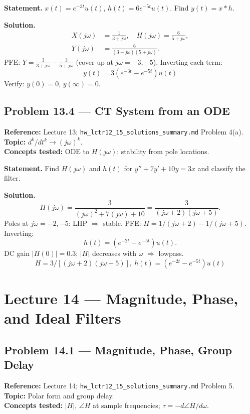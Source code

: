 \documentclass[11pt]{article}
\begin{document}
\textbf{Statement.} $x(t) = e^{-3t}u(t)$, $h(t) = 6 e^{-5t}u(t)$. Find $y(t) = x*h$.

\textbf{Solution.}
\begin{align*}
X(j\omega) &= \frac{1}{3+j\omega},\quad H(j\omega) = \frac{6}{5+j\omega},\\
Y(j\omega) &= \frac{6}{(3+j\omega)(5+j\omega)}.
\end{align*}
PFE: $Y = \frac{3}{3+j\omega} - \frac{3}{5+j\omega}$ (cover-up at $j\omega=-3,-5$). Inverting each term:
\[
\boxed{\,y(t) = 3(e^{-3t} - e^{-5t})u(t)\,}
\]
Verify: $y(0)=0$, $y(\infty)=0$. \checkmark

\subsection{Problem 13.4 --- CT System from an ODE}
\textbf{Reference:} Lecture 13; \texttt{hw\_lctr12\_15\_solutions\_summary.md} Problem 4(a).\\
\textbf{Topic:} $d^k/dt^k\to(j\omega)^k$.\\
\textbf{Concepts tested:} ODE to $H(j\omega)$; stability from pole locations.

\textbf{Statement.} Find $H(j\omega)$ and $h(t)$ for $y'' + 7y' + 10 y = 3 x$ and classify the filter.

\textbf{Solution.}
\[
H(j\omega) = \frac{3}{(j\omega)^2 + 7(j\omega) + 10} = \frac{3}{(j\omega+2)(j\omega+5)}.
\]
Poles at $j\omega=-2,-5$: LHP $\Rightarrow$ stable. PFE: $H = 1/(j\omega+2) - 1/(j\omega+5)$. Inverting:
\[
h(t) = (e^{-2t}-e^{-5t})u(t).
\]
DC gain $|H(0)| = 0.3$; $|H|$ decreases with $\omega$ $\Rightarrow$ lowpass.
\[
\boxed{\,H = 3/[(j\omega+2)(j\omega+5)],\ h(t)=(e^{-2t}-e^{-5t})u(t)\,}
\]

\section{Lecture 14 --- Magnitude, Phase, and Ideal Filters}

\subsection{Problem 14.1 --- Magnitude, Phase, Group Delay}
\textbf{Reference:} Lecture 14; \texttt{hw\_lctr12\_15\_solutions\_summary.md} Problem 5.\\
\textbf{Topic:} Polar form and group delay.\\
\textbf{Concepts tested:} $|H|$, $\angle H$ at sample frequencies; $\tau = -d\angle H/d\omega$.
\end{document}
